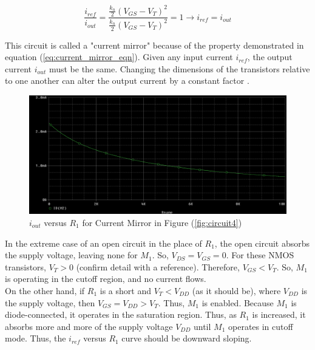 \begin{equation}
	\label{eq:current_mirror_eqn}
	\frac{ i_{ref} }{ i_{out} } = \frac{ \frac{k_n}{2} ( V_{GS} - V_{T} )^2 }{ \frac{k_n}{2} ( V_{GS} - V_{T} )^2 } = 1 \rightarrow i_{ref} = i_{out}
\end{equation}

This circuit is called a "current mirror" because of the property demonstrated in equation (\ref{eq:current_mirror_eqn}). Given any input current $i_{ref}$, the output current $i_{out}$ must be the same. Changing the dimensions of the transistors relative to one another can alter the output current by a constant factor \cite{current_src_dim}. \\


\FloatBarrier

\begin{figure}[h!]
	\centering
	\includegraphics[scale=0.5]{./images/circuit4_r_sweep.PNG}
	\caption{$i_{out}$ versus $R_1$ for Current Mirror in Figure (\ref{fig:circuit4})}
	\label{fig:circuit4_r_sweep}
\end{figure}

\FloatBarrier

In the extreme case of an open circuit in the place of $R_1$, the open circuit absorbs the supply voltage, leaving none for $M_1$. So, $V_{DS} = V_{GS} = 0$. For these NMOS transistors, $V_{T} > 0$ (confirm detail with a reference). Therefore, $V_{GS} < V_{T}$. So, $M_1$ is operating in the cutoff region, and no current flows. \\

On the other hand, if $R_1$ is a short and $V_{T} < V_{DD}$ (as it should be), where $V_{DD}$ is the supply voltage, then $V_{GS} = V_{DD} > V_{T}$. Thus, $M_1$ is enabled. Because $M_1$ is diode-connected, it operates in the saturation region. Thus, as $R_1$ is increased, it absorbs more and more of the supply voltage $V_{DD}$ until $M_1$ operates in cutoff mode. Thus, the $i_{ref}$ versus $R_1$ curve should be downward sloping.\\

